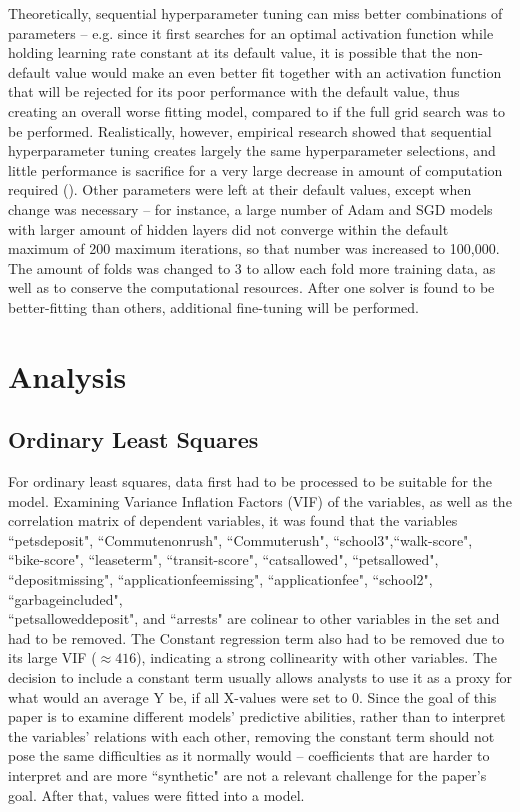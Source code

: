 \documentclass[12pt]{report}
\begin{document}
Theoretically, sequential hyperparameter tuning can miss better combinations of parameters -- e.g. since it first searches for an optimal activation function while holding learning rate constant at its default value, it is possible that the non-default value would make an even better fit together with an activation function that will be rejected for its poor performance with the default value, thus creating an overall worse fitting model, compared to if the full grid search was to be performed. Realistically, however, empirical research showed that sequential hyperparameter tuning creates largely the same hyperparameter selections, and little performance is sacrifice for a very large decrease in amount of computation required (\cite{jin2022}). Other parameters were left at their default values, except when change was necessary -- for instance, a large number of Adam and SGD models with larger amount of hidden layers did not converge within the default maximum of 200 maximum iterations, so that number was increased to 100,000. The amount of folds was changed to 3 to allow each fold more training data, as well as to conserve the computational resources. After one solver is found to be better-fitting than others, additional fine-tuning will be performed.


\section{Analysis}
\subsection{Ordinary Least Squares}
For ordinary least squares, data first had to be processed to be suitable for the model. Examining Variance Inflation Factors (VIF) of the variables, as well as the correlation matrix of dependent variables, it was found that the variables ``pets\textunderscore deposit", ``Commute\textunderscore nonrush", ``Commute\textunderscore rush", ``school3",``walk-score", ``bike-score", ``lease\textunderscore term", ``transit-score", ``cats\textunderscore allowed", ``pets\textunderscore allowed", ``deposit\textunderscore missing", ``application\textunderscore fee\textunderscore missing", ``application\textunderscore fee", ``school2", ``garbageincluded", \\ ``pets\textunderscore allowed\textunderscore deposit", and ``arrests" are colinear to other variables in the set and had to be removed. The Constant regression term also had to be removed due to its large VIF ($\approx416$), indicating a strong collinearity with other variables. The decision to include a constant term usually allows analysts to use it as a proxy for what would an average Y be, if all X-values were set to 0. Since the goal of this paper is to examine different models' predictive abilities, rather than to interpret the variables' relations with each other, removing the constant term should not pose the same difficulties as it normally would -- coefficients that are harder to interpret and are more ``synthetic" are not a relevant challenge for the paper's goal. After that, values were fitted into a model.
\end{document}
